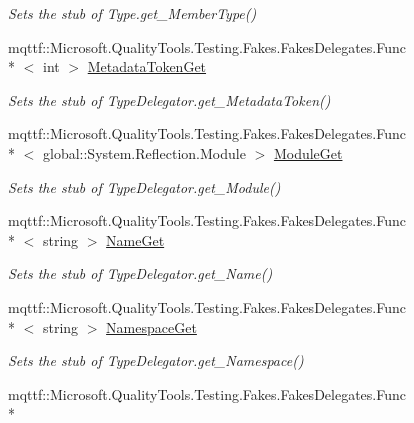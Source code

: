 \begin{DoxyCompactItemize}
\begin{DoxyCompactList}\small\item\em Sets the stub of Type.\-get\-\_\-\-Member\-Type()\end{DoxyCompactList}\item 
mqttf\-::\-Microsoft.\-Quality\-Tools.\-Testing.\-Fakes.\-Fakes\-Delegates.\-Func\\*
$<$ int $>$ \hyperlink{class_system_1_1_reflection_1_1_fakes_1_1_stub_type_delegator_a9368c4da5df5d1d865b46facf9a18ff8}{Metadata\-Token\-Get}
\begin{DoxyCompactList}\small\item\em Sets the stub of Type\-Delegator.\-get\-\_\-\-Metadata\-Token()\end{DoxyCompactList}\item 
mqttf\-::\-Microsoft.\-Quality\-Tools.\-Testing.\-Fakes.\-Fakes\-Delegates.\-Func\\*
$<$ global\-::\-System.\-Reflection.\-Module $>$ \hyperlink{class_system_1_1_reflection_1_1_fakes_1_1_stub_type_delegator_aecbb8b9265c6b5aa28201110f7ce7e54}{Module\-Get}
\begin{DoxyCompactList}\small\item\em Sets the stub of Type\-Delegator.\-get\-\_\-\-Module()\end{DoxyCompactList}\item 
mqttf\-::\-Microsoft.\-Quality\-Tools.\-Testing.\-Fakes.\-Fakes\-Delegates.\-Func\\*
$<$ string $>$ \hyperlink{class_system_1_1_reflection_1_1_fakes_1_1_stub_type_delegator_ad0677885a645b4a2671cde8fcb2f74d3}{Name\-Get}
\begin{DoxyCompactList}\small\item\em Sets the stub of Type\-Delegator.\-get\-\_\-\-Name()\end{DoxyCompactList}\item 
mqttf\-::\-Microsoft.\-Quality\-Tools.\-Testing.\-Fakes.\-Fakes\-Delegates.\-Func\\*
$<$ string $>$ \hyperlink{class_system_1_1_reflection_1_1_fakes_1_1_stub_type_delegator_ac8432f7439d1a32c17db17694f9958d8}{Namespace\-Get}
\begin{DoxyCompactList}\small\item\em Sets the stub of Type\-Delegator.\-get\-\_\-\-Namespace()\end{DoxyCompactList}\item 
mqttf\-::\-Microsoft.\-Quality\-Tools.\-Testing.\-Fakes.\-Fakes\-Delegates.\-Func\\*

\end{DoxyCompactItemize}
